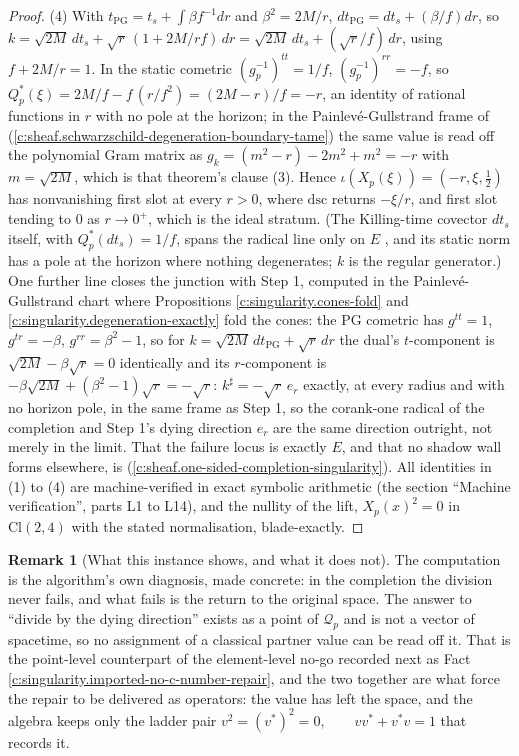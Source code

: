 \documentclass[11pt]{article}
\theoremstyle{definition}
\newtheorem{remark}[theorem]{Remark}
\theoremstyle{plain}
\providecommand{\Cl}{}\renewcommand{\Cl}{\mathrm{Cl}}
\providecommand{\dsc}{}\renewcommand{\dsc}{\mathrm{dsc}}
\providecommand{\er}{}\renewcommand{\er}{e_r}
\begin{document}
\begin{proof}
(4) With $t_{\mathrm{PG}} = t_s + \int \beta f^{-1}dr$ and $\beta^{2} = 2M/r$, $dt_{\mathrm{PG}} = dt_s + (\beta/f)dr$, so $k = \sqrt{2M}\,dt_s + \sqrt r\,(1 + 2M/rf)\,dr = \sqrt{2M}\,dt_s + (\sqrt r/f)\,dr$, using $f + 2M/r = 1$. In the static cometric $(g_p^{-1})^{tt} = 1/f$, $(g_p^{-1})^{rr} = -f$, so $Q^*_p(\xi) = 2M/f - f\,(r/f^{2}) = (2M - r)/f = -r$, an identity of rational functions in $r$ with no pole at the horizon; in the Painlev\'e-Gullstrand frame of \cite[Thm.~8.7]{ButlerT4} (\ref{c:sheaf.schwarzschild-degeneration-boundary-tame}) the same value is read off the polynomial Gram matrix as $g_k = (m^{2} - r) - 2m^{2} + m^{2} = -r$ with $m = \sqrt{2M}$, which is that theorem's clause (3). Hence $\iota(X_p(\xi)) = (-r, \xi, \tfrac12)$ has nonvanishing first slot at every $r > 0$, where $\dsc$ returns $-\xi/r$, and first slot tending to $0$ as $r \to 0^+$, which is the ideal stratum. (The Killing-time covector $dt_s$ itself, with $Q^*_p(dt_s) = 1/f$, spans the radical line only on $E$ \cite[Thm.~8.7(4)]{ButlerT4}, and its static norm has a pole at the horizon where nothing degenerates; $k$ is the regular generator.) One further line closes the junction with Step 1, computed in the Painlev\'e-Gullstrand chart where Propositions \ref{c:singularity.cones-fold} and \ref{c:singularity.degeneration-exactly} fold the cones: the PG cometric has $g^{tt} = 1$, $g^{tr} = -\beta$, $g^{rr} = \beta^{2} - 1$, so for $k = \sqrt{2M}\,dt_{\mathrm{PG}} + \sqrt r\,dr$ the dual's $t$-component is $\sqrt{2M} - \beta\sqrt r = 0$ identically and its $r$-component is $-\beta\sqrt{2M} + (\beta^{2} - 1)\sqrt r = -\sqrt r$: $k^{\sharp} = -\sqrt r\,\er$ exactly, at every radius and with no horizon pole, in the same frame as Step 1, so the corank-one radical of the completion and Step 1's dying direction $\er$ are the same direction outright, not merely in the limit. That the failure locus is exactly $E$, and that no shadow wall forms elsewhere, is \cite[Thm.~8.12]{ButlerT4} (\ref{c:sheaf.one-sided-completion-singularity}). All identities in (1) to (4) are machine-verified in exact symbolic arithmetic (the section ``Machine verification'', parts L1 to L14), and the nullity of the lift, $X_p(x)^{2} = 0$ in $\Cl(2,4)$ with the stated normalisation, blade-exactly.

\end{proof}

\begin{remark}[What this instance shows, and what it does not]\label{c:note.singularity.what-instance-shows-what-it-does}
The computation is the algorithm's own diagnosis, made concrete: in the completion the division never fails, and what fails is the return to the original space. The answer to ``divide by the dying direction'' exists as a point of $\mathcal{Q}_p$ and is not a vector of spacetime, so no assignment of a classical partner value can be read off it. That is the point-level counterpart of the element-level no-go recorded next as Fact \ref{c:singularity.imported-no-c-number-repair}, and the two together are what force the repair to be delivered as operators: the value has left the space, and the algebra keeps only the ladder pair $v^2 = (v^*)^2 = 0, \qquad v v^* + v^* v = 1$ that records it.
\end{remark}
\end{document}
